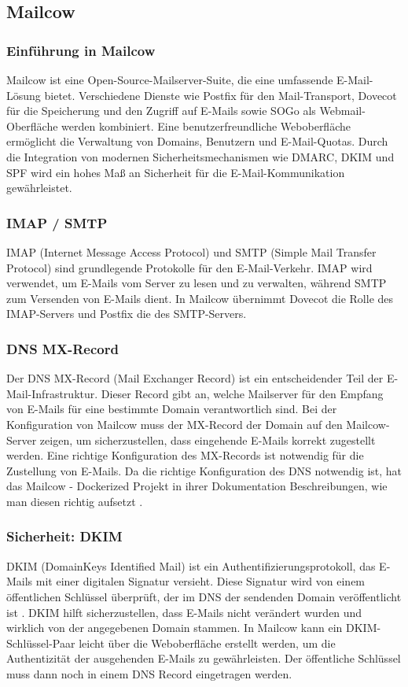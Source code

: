 \subsection{Mailcow}

\subsubsection{Einführung in Mailcow}
Mailcow ist eine Open-Source-Mailserver-Suite, die eine umfassende E-Mail-Lösung bietet. Verschiedene Dienste wie Postfix für den Mail-Transport, Dovecot für die Speicherung und den Zugriff auf E-Mails sowie SOGo als Webmail-Oberfläche werden kombiniert. Eine benutzerfreundliche Weboberfläche ermöglicht die Verwaltung von Domains, Benutzern und E-Mail-Quotas. Durch die Integration von modernen Sicherheitsmechanismen wie DMARC, DKIM und SPF wird ein hohes Maß an Sicherheit für die E-Mail-Kommunikation gewährleistet.

\subsubsection{IMAP / SMTP}
IMAP (Internet Message Access Protocol) und SMTP (Simple Mail Transfer Protocol) sind grundlegende Protokolle für den E-Mail-Verkehr. IMAP wird verwendet, um E-Mails vom Server zu lesen und zu verwalten, während SMTP zum Versenden von E-Mails dient. In Mailcow übernimmt Dovecot die Rolle des IMAP-Servers und Postfix die des SMTP-Servers.

\subsubsection{DNS MX-Record}
Der DNS MX-Record (Mail Exchanger Record) ist ein entscheidender Teil der E-Mail-Infrastruktur. Dieser Record gibt an, welche Mailserver für den Empfang von E-Mails für eine bestimmte Domain verantwortlich sind. Bei der Konfiguration von Mailcow muss der MX-Record der Domain auf den Mailcow-Server zeigen, um sicherzustellen, dass eingehende E-Mails korrekt zugestellt werden. Eine richtige Konfiguration des MX-Records ist notwendig für die Zustellung von E-Mails. Da die richtige Konfiguration des DNS notwendig ist, hat das Mailcow - Dockerized Projekt in ihrer Dokumentation Beschreibungen, wie man diesen richtig aufsetzt \cite{mailcowDockerizedDNS}.

\subsubsection{Sicherheit: DKIM}
DKIM (DomainKeys Identified Mail) ist ein Authentifizierungsprotokoll, das E-Mails mit einer digitalen Signatur versieht. Diese Signatur wird von einem öffentlichen Schlüssel überprüft, der im DNS der sendenden Domain veröffentlicht ist \cite{dkim}. DKIM hilft sicherzustellen, dass E-Mails nicht verändert wurden und wirklich von der angegebenen Domain stammen. In Mailcow kann ein DKIM-Schlüssel-Paar leicht über die Weboberfläche erstellt werden, um die Authentizität der ausgehenden E-Mails zu gewährleisten. Der öffentliche Schlüssel muss dann noch in einem DNS Record eingetragen werden.

